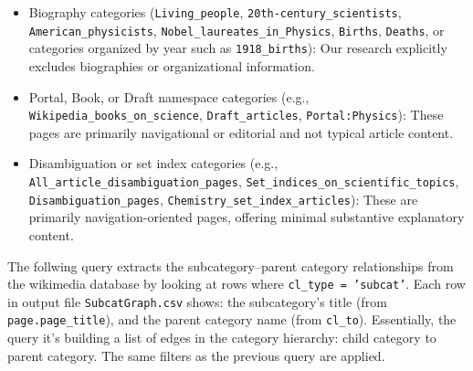 \begin{itemize}
\item Biography categories (\texttt{Living\_people}, \texttt{20th-century\_scientists}, \texttt{American\_physicists}, \texttt{Nobel\_laureates\_in\_Physics}, \texttt{Births}, \texttt{Deaths}, or categories organized by year such as \texttt{1918\_births}): Our research explicitly excludes biographies or organizational information.

\item Portal, Book, or Draft namespace categories (e.g., \texttt{Wikipedia\_books\_on\_science}, \texttt{Draft\_articles}, \texttt{Portal:Physics}): These pages are primarily navigational or editorial and not typical article content.

\item Disambiguation or set index categories (e.g., \texttt{All\_article\_disambiguation\_pages}, \texttt{Set\_indices\_on\_scientific\_topics}, \texttt{Disambiguation\_pages}, \texttt{Chemistry\_set\_index\_articles}): These are primarily navigation-oriented pages, offering minimal substantive explanatory content.

\end{itemize}


The follwing query extracts the subcategory–parent category relationships from the wikimedia database by looking at rows where \texttt{cl\_type = 'subcat'}. Each row in output file \texttt{SubcatGraph.csv} shows: the subcategory’s title (from \texttt{page.page\_title}), and the parent category name (from \texttt{cl\_to}). Essentially, the query it’s building a list of edges in the category hierarchy: child category to parent category. The same filters as the previous query are applied.

